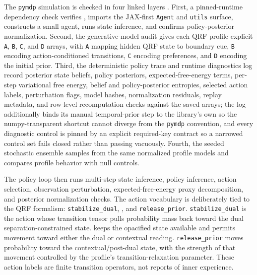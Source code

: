 \documentclass[
]{article}
\begin{document}
The \texttt{pymdp} simulation is checked in four linked layers
\citep{heins2022pymdp, dacosta2020discrete}. First, a pinned-runtime
dependency check verifies , imports
the JAX-first \texttt{Agent} and \texttt{utils} surface, constructs a
small agent, runs state inference, and confirms policy-posterior
normalization. Second, the generative-model audit gives each QRF profile
explicit \texttt{A}, \texttt{B}, \texttt{C}, and \texttt{D} arrays, with
\texttt{A} mapping hidden QRF state to boundary cue, \texttt{B} encoding
action-conditioned transitions, \texttt{C} encoding preferences, and
\texttt{D} encoding the initial prior. Third, the deterministic policy
trace and runtime diagnostics log record posterior state beliefs, policy
posteriors, expected-free-energy terms, per-step variational free
energy, belief and policy-posterior entropies, selected action labels,
perturbation flags, model hashes, normalization residuals, replay
metadata, and row-level recomputation checks against the saved arrays;
the log additionally binds its manual temporal-prior step to the
library's own  so the numpy-transparent
shortcut cannot diverge from the \texttt{pymdp} convention, and every
diagnostic control is pinned by an explicit required-key contract so a
narrowed control set fails closed rather than passing vacuously. Fourth,
the seeded stochastic ensemble samples from the same normalized profile
models and compares profile behavior with null controls.

The policy loop then runs multi-step state inference, policy inference,
action selection, observation perturbation, expected-free-energy proxy
decomposition, and posterior normalization checks. The action vocabulary
is deliberately tied to the QRF formalism: \texttt{stabilize\_dual},
, and \texttt{release\_prior}.
\texttt{stabilize\_dual} is the action whose transition tensor pulls
probability mass back toward the dual separation-constrained state.
 keeps the opacified state available and
permits movement toward either the dual or contextual reading.
\texttt{release\_prior} moves probability toward the
contextual/post-dual state, with the strength of that movement
controlled by the profile's transition-relaxation parameter. These
action labels are finite transition operators, not reports of inner
experience.
\end{document}
